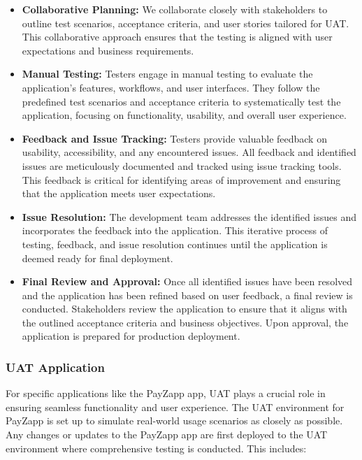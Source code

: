 \documentclass[12pt,a4paper]{report}
\begin{document}
\begin{itemize}
    \item \textbf{Collaborative Planning:} We collaborate closely with stakeholders to outline test scenarios, acceptance criteria, and user stories tailored for UAT. This collaborative approach ensures that the testing is aligned with user expectations and business requirements.
    
    \item \textbf{Manual Testing:} Testers engage in manual testing to evaluate the application's features, workflows, and user interfaces. They follow the predefined test scenarios and acceptance criteria to systematically test the application, focusing on functionality, usability, and overall user experience.
    
    \item \textbf{Feedback and Issue Tracking:} Testers provide valuable feedback on usability, accessibility, and any encountered issues. All feedback and identified issues are meticulously documented and tracked using issue tracking tools. This feedback is critical for identifying areas of improvement and ensuring that the application meets user expectations.
    
    \item \textbf{Issue Resolution:} The development team addresses the identified issues and incorporates the feedback into the application. This iterative process of testing, feedback, and issue resolution continues until the application is deemed ready for final deployment.
    
    \item \textbf{Final Review and Approval:} Once all identified issues have been resolved and the application has been refined based on user feedback, a final review is conducted. Stakeholders review the application to ensure that it aligns with the outlined acceptance criteria and business objectives. Upon approval, the application is prepared for production deployment.
\end{itemize}

\subsubsection{UAT Application}

For specific applications like the PayZapp app, UAT plays a crucial role in ensuring seamless functionality and user experience. The UAT environment for PayZapp is set up to simulate real-world usage scenarios as closely as possible. Any changes or updates to the PayZapp app are first deployed to the UAT environment where comprehensive testing is conducted. This includes:
\end{document}
